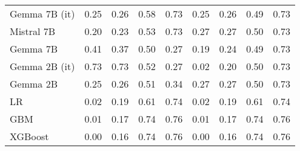 \begin{tabular}{lllllllll}
Gemma 7B (it) & 0.25 & 0.26 & \cellcolor{cyan!25.0} 0.58 & \cellcolor{cyan!21.8} 0.73 & \cellcolor{orange!8.9} 0.25 & 0.26 & \cellcolor{orange!3.1} 0.49 & \cellcolor{cyan!22.3} 0.73 \\
Mistral 7B & 0.20 & \cellcolor{cyan!8.6} 0.23 & 0.53 & \cellcolor{cyan!23.4} 0.73 & \cellcolor{orange!25.0} 0.27 & \cellcolor{orange!25.0} 0.27 & 0.50 & \cellcolor{cyan!25.0} 0.73 \\
Gemma 7B & 0.41 & 0.37 & \cellcolor{orange!25.0} 0.50 & \cellcolor{orange!25.0} 0.27 & 0.19 & 0.24 & 0.49 & \cellcolor{cyan!25.0} 0.73 \\
Gemma 2B (it) & \cellcolor{orange!25.0} 0.73 & \cellcolor{orange!25.0} 0.73 & 0.52 & \cellcolor{orange!25.0} 0.27 & \cellcolor{cyan!25.0} 0.02 & \cellcolor{cyan!25.0} 0.20 & 0.50 & \cellcolor{cyan!25.0} 0.73 \\
Gemma 2B & 0.25 & 0.26 & 0.51 & 0.34 & \cellcolor{orange!25.0} 0.27 & \cellcolor{orange!25.0} 0.27 & 0.50 & \cellcolor{cyan!25.0} 0.73 \\
LR & 0.02 & 0.19 & 0.61 & 0.74 & 0.02 & 0.19 & 0.61 & 0.74 \\
GBM & 0.01 & 0.17 & 0.74 & 0.76 & 0.01 & 0.17 & 0.74 & 0.76 \\
XGBoost & 0.00 & 0.16 & 0.74 & 0.76 & 0.00 & 0.16 & 0.74 & 0.76 \\
\bottomrule
\end{tabular}

